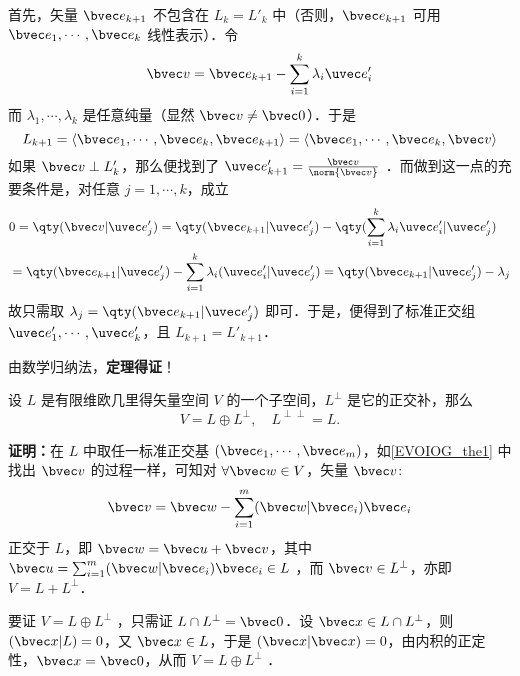 首先，矢量 $\bvec e_{k+1}$ 不包含在 $L_k=L'_k$ 中（否则，$\bvec e_{k+1}$ 可用 $\bvec e_1,\cdots,\bvec e_k$ 线性表示）．令
\begin{equation}
\bvec v=\bvec e_{k+1}-\sum_{i=1}^{k}\lambda_i\uvec e'_i
\end{equation}
而 $\lambda_1,\cdots,\lambda_k$ 是任意纯量（显然 $\bvec v\neq\bvec 0$）．于是
\begin{equation}
L_{k+1}=\langle\bvec e_1,\cdots,\bvec e_k,\bvec e_{k+1}\rangle=\langle\bvec e_1,\cdots,\bvec e_k,\bvec v\rangle
\end{equation}
如果 $\bvec v\perp L'_k$，那么便找到了 $\uvec e'_{k+1}=\frac{\bvec v}{\norm{\bvec v}}$ ．而做到这一点的充要条件是，对任意 $j=1,\cdots,k$，成立
\begin{equation}
\begin{aligned}
&0=\qty(\bvec v|\uvec e'_j)=\qty(\bvec e_{k+1}|\uvec e'_j)-\qty(\sum_{i=1}^k\lambda_i\uvec e'_i|\uvec e'_j)\\
&=\qty(\bvec e_{k+1}|\uvec e'_j)-\sum_{i=1}^k\lambda_i(\uvec e'_i|\uvec e'_j)=\qty(\bvec e_{k+1}|\uvec e'_j)-\lambda_j
\end{aligned}
\end{equation}
故只需取 $\lambda_j=\qty(\bvec e_{k+1}|\uvec e'_j)$ 即可．于是，便得到了标准正交组 $\uvec e'_1,\cdots,\uvec e'_k$，且 $L_{k+1}=L'_{k+1}$．

由数学归纳法，\textbf{定理得证}！

\begin{theorem}{}\label{EVOIOG_the2}
设 $L$ 是有限维欧几里得矢量空间 $V$ 的一个子空间，$L^{\perp}$ 是它的正交补，那么
\begin{equation}
V=L\oplus L^{\perp},\quad L^{\perp\perp}=L.
\end{equation}
\end{theorem}
\textbf{证明：}在 $L$ 中取任一标准正交基 $(\bvec e_1,\cdots,\bvec e_m)$，如\autoref{EVOIOG_the1} 中找出 $\bvec v$ 的过程一样，可知对 $\forall \bvec w\in V$，矢量 $\bvec v$:
\begin{equation}
\bvec v=\bvec w-\sum_{i=1}^m(\bvec w|\bvec e_i)\bvec e_i
\end{equation}
正交于 $L$，即 $\bvec w=\bvec u+\bvec v$，其中 $\bvec u=\sum_{i=1}^m(\bvec w|\bvec e_i)\bvec e_i\in L$ ，而 $\bvec v\in L^{\perp}$，亦即 $V=L+L^{\perp}$．

要证 $V=L\oplus L^{\perp}$ ，只需证 $L\cap L^{\perp}=\bvec 0$．设 $\bvec x\in L\cap L^{\perp}$，则 $(\bvec x|L)=0$，又 $\bvec x\in L$，于是 $(\bvec x|\bvec x)=0$，由内积的正定性，$\bvec x=\bvec 0$，从而 $V=L\oplus L^{\perp}$ ．

